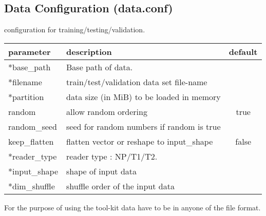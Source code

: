 \subsection{Data Configuration (data.conf)}
\begin{table}[h]
\begin{center}
  \medskip  \small configuration for training/testing/validation.
   \begin{tabular}{|l|p{8cm}|c|} \hline
   	\textbf{parameter} & \textbf{description} & \textbf{default}\\  \hline
 	*base\_path & Base path of data. &  \\  \hline
   	*filename &  train/test/validation data set file-name & \\  \hline
	*partition & data size (in MiB) to be loaded in memory & \\  \hline
	random & allow random ordering  & true \\  \hline
	random\_seed & seed for random numbers if random is true & \\  \hline 
	keep\_flatten & flatten vector or reshape to input\_shape & false \\  \hline
	*reader\_type & reader type : NP/T1/T2. & \\  \hline		
	*input\_shape & shape of input data & \\  \hline
	*dim\_shuffle &  shuffle order of the input data &  \\ \hline
  \end{tabular}		
\end{center}
\end{table} 
\noindent For the purpose of using the tool-kit data have to be in anyone of the file format.
